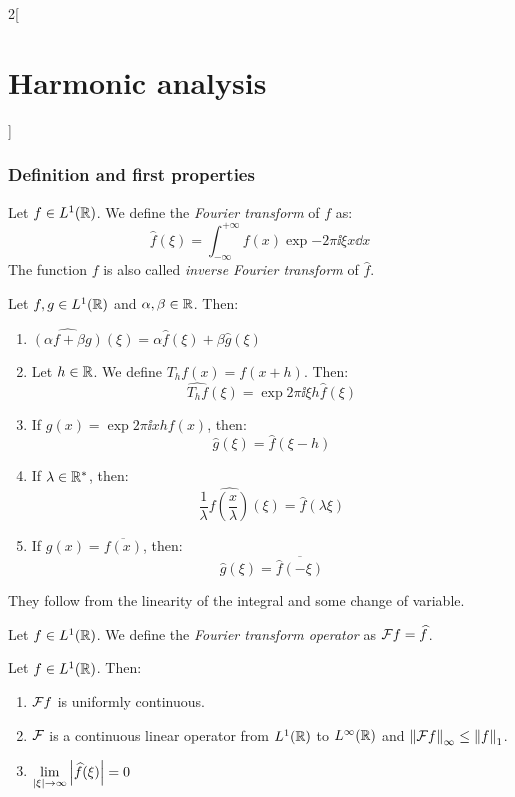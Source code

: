 \documentclass[../../../main_math.tex]{subfiles}
\begin{document}
\begin{multicols}{2}[\section{Harmonic analysis}]
  \subsubsection{Definition and first properties}
  \begin{definition}
    Let $f\in L^1(\mathbb{R})$. We define the \emph{Fourier transform} of $f$ as:
    $$\widehat{f}(\xi)=\int_{-\infty}^{+\infty}f(x)\exp{-2\pi \ii\xi x}\dd{x}$$
    The function $f$ is also called \emph{inverse Fourier transform} of $\widehat{f}$.
  \end{definition}
  \begin{proposition}\label{HA:fourierTransProperties}
    Let $f,g\in L^1(\mathbb{R})$ and $\alpha,\beta\in\mathbb{R}$. Then:
    \begin{enumerate}
      \item $\widehat{(\alpha f+\beta g)}(\xi)=\alpha\widehat{f}(\xi)+\beta \widehat{g}(\xi)$
            \item\label{HA:FTprop2} Let $h\in\mathbb{R}$. We define $T_hf(x)=f(x+h)$. Then: $$\widehat{T_hf}(\xi)=\exp{2\pi\ii \xi h}\widehat{f}(\xi)$$
            \item\label{HA:FTprop3} If $g(x)=\exp{2\pi\ii x h}f(x)$, then: $$\widehat{g}(\xi)=\widehat{f}(\xi-h)$$
            \item\label{HA:FTprop4} If $\lambda\in\mathbb{R}^*$, then: $$\frac{1}{\lambda}\widehat{f\left(\frac{x}{\lambda}\right)}(\xi)=\widehat{f}(\lambda\xi)$$
            \item\label{HA:FTprop5} If $g(x)=\overline{f(x)}$, then: $$\widehat{g}(\xi)=\overline{\widehat{f}(-\xi)}$$
    \end{enumerate}
  \end{proposition}
  \begin{sproof}
    They follow from the linearity of the integral and some change of variable.
  \end{sproof}
  \begin{definition}
    Let $f\in L^1(\mathbb{R})$. We define the \emph{Fourier transform operator} as $\mathcal{F} f=\widehat{f}$.
  \end{definition}
  \begin{theorem}\label{HA:riemannlebesgue}
    Let $f\in L^1(\mathbb{R})$. Then:
    \begin{enumerate}
      \item $\mathcal{F} f$ is uniformly continuous.
      \item $\mathcal{F}$ is a continuous linear operator from $L^1(\mathbb{R})$ to $L^\infty(\mathbb{R})$ and $\left\|\mathcal{F} f\right\|_{\infty}\leq \left\|f\right\|_1$.
      \item $\displaystyle\lim_{\abs{\xi}\to\infty} \abs{\widehat{f}(\xi)}=0$

\end{enumerate}
\end{theorem}
\end{multicols}
\end{document}
